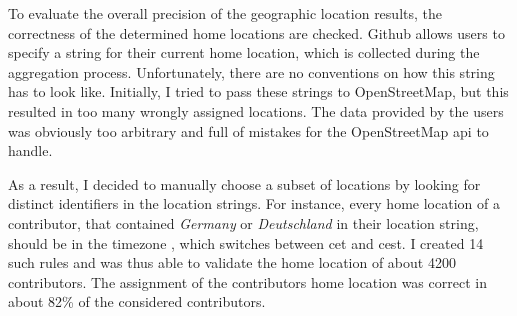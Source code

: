To evaluate the overall precision of the geographic location results, the correctness of the determined home locations are checked.
Github allows users to specify a string for their current home location, which is collected during the aggregation process.
Unfortunately, there are no conventions on how this string has to look like.
Initially, I tried to pass these strings to OpenStreetMap, but this resulted in too many wrongly assigned locations.
The data provided by the users was obviously too arbitrary and full of mistakes for the OpenStreetMap \ac{api} to handle.

As a result, I decided to manually choose a subset of locations by looking for distinct identifiers in the location strings.
For instance, every home location of a contributor, that contained \emph{Germany} or \emph{Deutschland} in their location string, should be in the timezone , which switches between \ac{cet} and \ac{cest}.
I created 14 such rules and was thus able to validate the home location of about 4200 contributors.
The assignment of the contributors home location was correct in about 82\% of the considered contributors.

